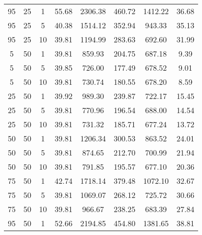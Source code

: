 \begin{table}[h]
\begin{tabular}{ccc|c|c|c|c|c}
95 & 25 & 1 & \cellcolor{gray!1}55.68 & \cellcolor{gray!1}2306.38 & \cellcolor{gray!1}460.72 & \cellcolor{gray!1}1412.22 & 36.68\\
95 & 25 & 5 & \cellcolor{gray!45}40.38 & \cellcolor{gray!1}1514.12 & \cellcolor{gray!1}352.94 & \cellcolor{gray!1}943.33 & 35.13\\
95 & 25 & 10 & \cellcolor{gray!50}39.81 & \cellcolor{gray!1}1194.99 & \cellcolor{gray!1}283.63 & \cellcolor{gray!40}692.60 & 31.99\\
5 & 50 & 1 & \cellcolor{gray!50}39.81 & \cellcolor{gray!28}859.93 & \cellcolor{gray!24}204.75 & \cellcolor{gray!42}687.18 & 9.39\\
5 & 50 & 5 & \cellcolor{gray!50}39.85 & \cellcolor{gray!50}726.00 & \cellcolor{gray!50}177.49 & \cellcolor{gray!45}678.52 & 9.01\\
5 & 50 & 10 & \cellcolor{gray!50}39.81 & \cellcolor{gray!50}730.74 & \cellcolor{gray!47}180.55 & \cellcolor{gray!45}678.20 & 8.59\\
25 & 50 & 1 & \cellcolor{gray!49}39.92 & \cellcolor{gray!7}989.30 & \cellcolor{gray!1}239.87 & \cellcolor{gray!31}722.17 & 15.45\\
25 & 50 & 5 & \cellcolor{gray!50}39.81 & \cellcolor{gray!43}770.96 & \cellcolor{gray!32}196.54 & \cellcolor{gray!42}688.00 & 14.54\\
25 & 50 & 10 & \cellcolor{gray!50}39.81 & \cellcolor{gray!50}731.32 & \cellcolor{gray!42}185.71 & \cellcolor{gray!45}677.24 & 13.72\\
50 & 50 & 1 & \cellcolor{gray!50}39.81 & \cellcolor{gray!1}1206.34 & \cellcolor{gray!1}300.53 & \cellcolor{gray!1}863.52 & 24.01\\
50 & 50 & 5 & \cellcolor{gray!50}39.81 & \cellcolor{gray!26}874.65 & \cellcolor{gray!17}212.70 & \cellcolor{gray!38}700.99 & 21.94\\
50 & 50 & 10 & \cellcolor{gray!50}39.81 & \cellcolor{gray!40}791.85 & \cellcolor{gray!33}195.57 & \cellcolor{gray!45}677.10 & 20.36\\
75 & 50 & 1 & \cellcolor{gray!21}42.74 & \cellcolor{gray!1}1718.14 & \cellcolor{gray!1}379.48 & \cellcolor{gray!1}1072.10 & 32.67\\
75 & 50 & 5 & \cellcolor{gray!50}39.81 & \cellcolor{gray!1}1069.07 & \cellcolor{gray!1}268.12 & \cellcolor{gray!30}725.72 & 30.66\\
75 & 50 & 10 & \cellcolor{gray!50}39.81 & \cellcolor{gray!10}966.67 & \cellcolor{gray!1}238.25 & \cellcolor{gray!43}683.39 & 27.84\\
95 & 50 & 1 & \cellcolor{gray!1}52.66 & \cellcolor{gray!1}2194.85 & \cellcolor{gray!1}454.80 & \cellcolor{gray!1}1381.65 & 38.81\\

\end{tabular}
\end{table}
